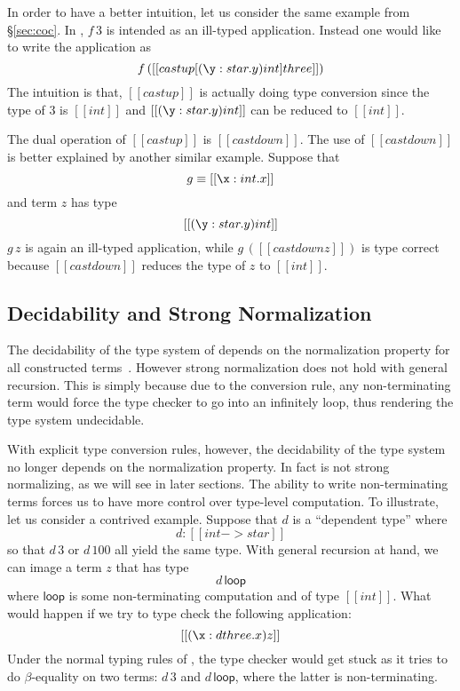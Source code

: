 In order to have a better intuition, let us consider the same example from \S\ref{sec:coc}. In \name, $f\,3$ is intended as an ill-typed application. Instead one would like to write the application as \[ f\,([[castup[(\y:star.y)int]three]]) \] The intuition is that, $[[castup]]$ is actually doing type conversion since the type of $ 3 $ is $ [[int]] $ and $ [[(\y:star.y)int]] $ can be reduced to $ [[int]] $.

The dual operation of $[[castup]]$ is $[[castdown]]$. The use of $[[castdown]]$ is better explained by another similar example. Suppose that \[ g \equiv [[\x:int.x]] \] and term $z$ has type \[ [[(\y:star.y)int]] \] $ g\,z $ is again an ill-typed application, while $ g\,([[castdown z]]) $ is type correct because $[[castdown]]$ reduces the type of $ z $ to $ [[int]] $.

\subsection{Decidability and Strong Normalization}


The decidability of the type system of \coc depends on the normalization property for all constructed terms~\cite{coc:decidability}. However strong normalization does not hold with general recursion. This is simply because due to the conversion rule, any non-terminating term would force the type checker to go into an infinitely loop, thus rendering the type system undecidable.

With explicit type conversion rules, however, the decidability of the type system no longer depends on the normalization property. In fact \name is not strong normalizing, as we will see in later sections. The ability to write non-terminating terms forces us to have more control over type-level computation. To illustrate, let us consider a contrived example. Suppose that $d$ is a ``dependent type'' where \[d : [[int -> star]]\] so that $d\,3$ or $d\,100$ all yield the same type.  With general recursion at hand, we can image  a term $z$ that has type \[d\,\mathsf{loop}\] where $\mathsf{loop}$ is some non-terminating computation and of type $[[int]]$. What would happen if we try to type check the following application: \[ [[(\x: d three.x)z]]\] Under the normal typing rules of \coc, the type checker would get stuck as it tries to do $\beta$-equality on two terms: $d\,3$ and $d\,\mathsf{loop}$, where the latter is non-terminating.

